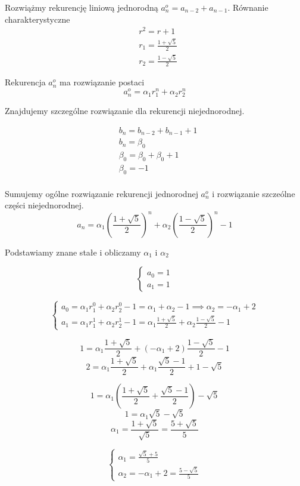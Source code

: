 \documentclass[12pt]{article}
\begin{document}
Rozwiążmy rekurencję liniową jednorodną $a_n^o = a_{n-2}+a_{n-1}$.
Równanie charakterystyczne
\begin{align*}
&r^2=r+1 \\
&r_1=\frac{1+\sqrt{5}}{2} \\
&r_2=\frac{1-\sqrt{5}}{2}  
\end{align*}

Rekurencja $a_n^o$ ma rozwiązanie postaci 
$$ 
a_n^o = \alpha_1r_1^n+\alpha_2r_2^n
$$

Znajdujemy szczególne rozwiązanie dla rekurencji niejednorodnej.

\begin{align*}
&b_n=b_{n-2}+b_{n-1}+1 \\
&b_n=\beta_0 \\
&\beta_0=\beta_0+\beta_0+1 \\
&\beta_0=-1 \\
\end{align*}

Sumujemy ogólne rozwiązanie rekurencji jednorodnej $a_n^o$ i rozwiązanie szczeólne części niejednorodnej.
$$
a_n= \alpha_1\left(\frac{1+\sqrt{5}}{2}\right)^n+\alpha_2\left(\frac{1-\sqrt{5}}{2}\right)^n - 1
$$

Podstawiamy znane stałe i obliczamy $\alpha_1$ i $\alpha_2$

$$
\begin{cases}
a_0=1 \\
a_1=1
\end{cases}
$$

$$
\begin{cases}
a_0 = \alpha_1r_1^0+\alpha_2r_2^0 - 1 = \alpha_1 + \alpha_2 - 1 \implies \alpha_2= -\alpha_1+2  \\
a_1 = \alpha_1r_1^1+\alpha_2r_2^1 - 1 = \alpha_1 \frac{1+\sqrt{5}}{2}+\alpha_2\frac{1-\sqrt{5}}{2} - 1
\end{cases}
$$

$$
1 = \alpha_1 \frac{1+\sqrt{5}}{2}+(-\alpha_1+2)\frac{1-\sqrt{5}}{2} - 1
$$
$$
2 = \alpha_1 \frac{1+\sqrt{5}}{2}+\alpha_1\frac{\sqrt{5}-1}{2}+1-\sqrt{5}
$$

$$
1 = \alpha_1 (\frac{1+\sqrt{5}}{2}+\frac{\sqrt{5}-1}{2})-\sqrt{5}
$$
$$
1 = \alpha_1\sqrt{5} -\sqrt{5}
$$
$$
\alpha_1 = \frac{1+\sqrt{5}}{\sqrt{5}} = \frac{5+\sqrt{5}}{5}
$$

$$
\begin{cases}
\alpha_1 = \frac{\sqrt{5}+5}{5} \\
\alpha_2 =  -\alpha_1+2 = \frac{5-\sqrt{5}}{5} 
\end{cases}
$$
\end{document}
